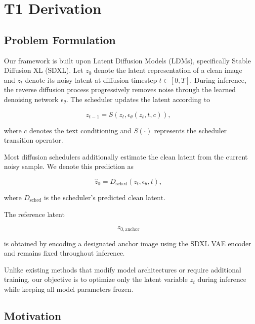 \documentclass[12pt]{article}
\begin{document}
\section{T1 Derivation}

\subsection{Problem Formulation}

Our framework is built upon Latent Diffusion Models (LDMs), specifically Stable Diffusion XL (SDXL). Let $z_0$ denote the latent representation of a clean image and $z_t$ denote its noisy latent at diffusion timestep $t \in [0,T]$. During inference, the reverse diffusion process progressively removes noise through the learned denoising network $\epsilon_\theta$. The scheduler updates the latent according to

\begin{equation}
z_{t-1} = S\left(z_t, \epsilon_\theta(z_t, t, c)\right),
\tag{1}
\end{equation}

where $c$ denotes the text conditioning and $S(\cdot)$ represents the scheduler transition operator.

Most diffusion schedulers additionally estimate the clean latent from the current noisy sample. We denote this prediction as

\begin{equation}
\hat{z}_0 = D_{\text{sched}}\left(z_t, \epsilon_\theta, t\right),
\tag{2}
\end{equation}

where $D_{\text{sched}}$ is the scheduler's predicted clean latent.

The reference latent

\begin{equation}
z_{0,\mathrm{anchor}}
\end{equation}

is obtained by encoding a designated anchor image using the SDXL VAE encoder and remains fixed throughout inference.

Unlike existing methods that modify model architectures or require additional training, our objective is to optimize only the latent variable $z_t$ during inference while keeping all model parameters frozen.

\subsection{Motivation}
\end{document}
